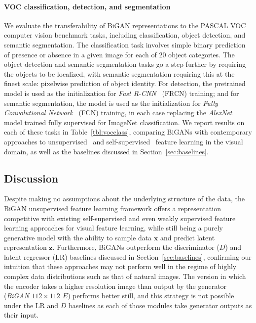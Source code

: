 \documentclass{article}
\renewcommand{\vec}[1]{\mathbf{#1}}
\newcommand{\x}{\vec{x}}
\newcommand{\z}{\vec{z}}
\newcommand{\refsec}[1]{Section~\ref{sec:#1}}
\newcommand{\reftbl}[1]{Table~\ref{tbl:#1}}
\begin{document}
\paragraph{VOC classification, detection, and segmentation}
We evaluate the transferability of BiGAN representations to the PASCAL VOC~\citep{pascal} computer vision benchmark tasks,
including classification, object detection, and semantic segmentation.
The classification task involves simple binary prediction of presence or absence in a given image for each of 20 object categories.
The object detection and semantic segmentation tasks go a step further by requiring the objects to be localized,
with semantic segmentation requiring this at the finest scale: pixelwise prediction of object identity.
For detection, the pretrained model is used as the initialization for \textit{Fast R-CNN}~\citep{fastrcnn} (FRCN) training;
and for semantic segmentation, the model is used as the initialization for \textit{Fully Convolutional Network}~\citep{fcn} (FCN) training,
in each case replacing the \textit{AlexNet}~\citep{supervision} model trained fully supervised for ImageNet classification.
We report results on each of these tasks in \reftbl{vocclass},
comparing BiGANs with contemporary approaches to unsupervised~\citep{datadep}
and self-supervised~\citep{carl,pulkit,xiaolong,deepak}
feature learning in the visual domain,
as well as the baselines discussed in \refsec{baselines}.


\subsection{Discussion}
Despite making no assumptions about the underlying structure of the data,
the BiGAN unsupervised feature learning framework offers a representation competitive with existing self-supervised and even weakly supervised feature learning approaches for visual feature learning,
while still being a purely generative model with the ability to sample data $\x$ and predict latent representation $\z$.
Furthermore, BiGANs outperform the discriminator ($D$) and latent regressor (LR) baselines discussed in \refsec{baselines},
confirming our intuition that these approaches may not perform well in the regime of highly complex data distributions such as that of natural images.
The version in which the encoder takes a higher resolution image than output by the generator (\textit{BiGAN $112\times112$ $E$}) performs better still,
and this strategy is not possible under the LR and $D$ baselines as each of those modules take generator outputs as their input.
\end{document}
